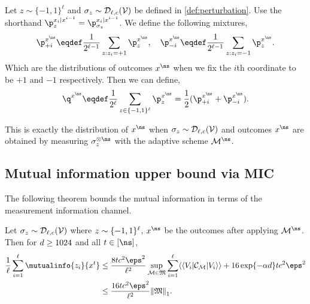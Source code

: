 Let $z\sim\{-1,1\}^{\ell}$ and $\sigma_z\sim {\mathcal{D}_{\ell,{c}}}({\mathcal{V}})$ be defined in \cref{def:perturbation}. Use the shorthand $\p_z^{\out_i|\out^{i-1}}=\p_{\sigma_z}^{\out_i|\out^{i-1}}$. 
We define the following mixtures,
\begin{equation}
    \p_{+i}^{\out^\ns}\eqdef \frac{1}{2^{\ell-1}}\sum_{\ptb:\ptb_i=+1}\p_z^{\out^\ns},\quad  \p_{-i}^{\out^\ns}\eqdef \frac{1}{2^{\ell-1}}\sum_{\ptb:\ptb_i=-1}\p_z^{\out^\ns}.
\end{equation}
Which are the distributions of outcomes $\out^\ns$ when we fix the $i$th coordinate to be $+1$ and $-1$ respectively. Then we can define,
\begin{equation}
\label{equ:out-distr}
\q^{\out^\ns}\eqdef\frac{1}{2^\ell}\sum_{z\in\{-1,1\}^\ell}\p_z^{\out^\ns}=\frac{1}{2}(\p_{+i}^{\out^\ns}+\p_{-i}^{\out^\ns}).  
\end{equation}

This is exactly the distribution of $\out^\ns$ when $\sigma_z\sim {\mathcal{D}_{\ell,{c}}}({\mathcal{V}})$ and outcomes $\out^\ns$ are obtained by measuring $\sigma_z^{\otimes\ns}$ with the adaptive scheme $\POVM^\ns$.




\subsection{Mutual information upper bound via MIC}
The following theorem bounds the mutual information in terms of the measurement information channel.
\begin{theorem}
\label{thm:avg-MI-upper}
    Let $\sigma_{z}\sim{\mathcal{D}_{\ell,{c}}}({\mathcal{V}})$ where ${z}\sim\{-1,1\}^{\ell}$, $\out^\ns$ be the outcomes after applying $\POVM^\ns$. Then for $d\ge 1024$ and all $t\in[\ns]$,
    \begin{align}
         \frac{1}{\ell}\sum_{i=1}^{\ell}\mutualinfo{\ptb_i}{\out^t}&\le \frac{8 tc^2 \eps^2}{\ell^2}  \sup_{\POVM\in {\povmset}}{\sum_{i=1}^\ell \vadj{V_i} \Choi_{\POVM} \vvec{V_i}} +16\exp\{-\alpha\dims\}tc^2\eps^2 \label{equ:avg-MI-partial}\\
         &\le \frac{16tc^2\eps^2}{\ell^2}\tracenorm{\povmset}.\label{equ:avg-MI-tracenorm}
    \end{align}
\end{theorem}

